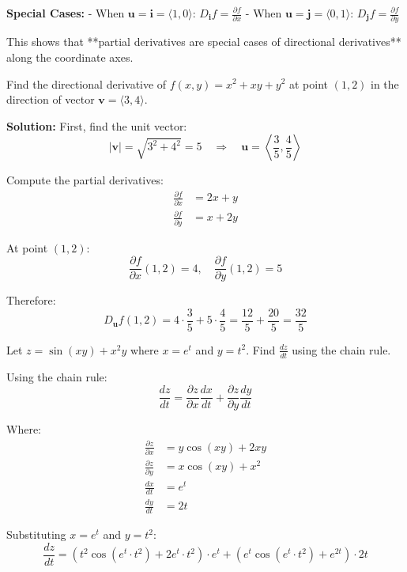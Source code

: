 \textbf{Special Cases:}
- When \(\mathbf{u} = \mathbf{i} = \langle 1, 0 \rangle\): \(D_{\mathbf{i}}f = \frac{\partial f}{\partial x}\)
- When \(\mathbf{u} = \mathbf{j} = \langle 0, 1 \rangle\): \(D_{\mathbf{j}}f = \frac{\partial f}{\partial y}\)

This shows that **partial derivatives are special cases of directional derivatives** along the coordinate axes.

\begin{eg}
  Find the directional derivative of \(f(x, y) = x^2 + xy + y^2\) at point \((1, 2)\) in the direction of vector \(\mathbf{v} = \langle 3, 4 \rangle\).

  \textbf{Solution:}
  First, find the unit vector:
  \[
    |\mathbf{v}| = \sqrt{3^2 + 4^2} = 5 \quad \Rightarrow \quad \mathbf{u} = \left\langle \frac{3}{5}, \frac{4}{5} \right\rangle
  \]

  Compute the partial derivatives:
  \begin{align}
    \frac{\partial f}{\partial x} &= 2x + y \\
    \frac{\partial f}{\partial y} &= x + 2y
  \end{align}

  At point \((1, 2)\):
  \[
    \frac{\partial f}{\partial x}(1, 2) = 4, \quad \frac{\partial f}{\partial y}(1, 2) = 5
  \]

  Therefore:
  \[
    D_{\mathbf{u}}f(1, 2) = 4 \cdot \frac{3}{5} + 5 \cdot \frac{4}{5} = \frac{12}{5} + \frac{20}{5} = \frac{32}{5}
  \]
\end{eg}

\begin{exercise}
  Let \(z = \sin(xy) + x^2y\) where \(x = e^t\) and \(y = t^2\). Find \(\frac{dz}{dt}\) using the chain rule.
\end{exercise}

\begin{answer}
  Using the chain rule:
  \[
    \frac{dz}{dt} = \frac{\partial z}{\partial x} \frac{dx}{dt} + \frac{\partial z}{\partial y} \frac{dy}{dt}
  \]

  Where:
  \begin{align}
    \frac{\partial z}{\partial x} &= y\cos(xy) + 2xy \\
    \frac{\partial z}{\partial y} &= x\cos(xy) + x^2 \\
    \frac{dx}{dt} &= e^t \\
    \frac{dy}{dt} &= 2t
  \end{align}

  Substituting \(x = e^t\) and \(y = t^2\):
  \[
    \frac{dz}{dt} = (t^2\cos(e^t \cdot t^2) + 2e^t \cdot t^2) \cdot e^t + (e^t\cos(e^t \cdot t^2) + e^{2t}) \cdot 2t
  \]
\end{answer}

